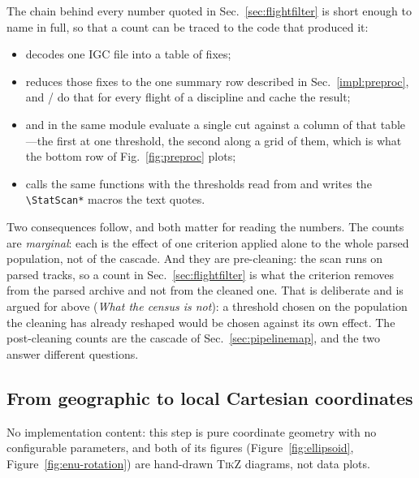 \begin{revblock}
The chain behind every number quoted in Sec.~\ref{sec:flightfilter} is short enough to
name in full, so that a count can be traced to the code that produced it:
\begin{itemize}[nosep]
  \item {} decodes one IGC file into a table of fixes;
  \item {} reduces those fixes to the one
        summary row described in Sec.~\ref{impl:preproc}, and
         /  do that for every flight of a
        discipline and cache the result;
  \item {} and  in the same module evaluate a
        single cut against a column of that table---the first at one threshold, the second
        along a grid of them, which is what the bottom row of Fig.~\ref{fig:preproc} plots;
  \item {} calls the same functions with
        the thresholds read from  and writes the
        \texttt{\textbackslash StatScan*} macros the text quotes.
\end{itemize}
Two consequences follow, and both matter for reading the numbers. The counts are
\emph{marginal}: each is the effect of one criterion applied alone to the whole parsed
population, not of the cascade. And they are pre-cleaning: the scan runs on parsed tracks,
so a count in Sec.~\ref{sec:flightfilter} is what the criterion removes from the parsed
archive and not from the cleaned one. That is deliberate and is argued for above
(\emph{What the census is not}): a threshold chosen on the population the cleaning has
already reshaped would be chosen against its own effect. The post-cleaning counts are the
cascade of Sec.~\ref{sec:pipelinemap}, and the two answer different questions.
\end{revblock}

\subsection{From geographic to local Cartesian coordinates}
\label{impl:enu}
No implementation content: this step is pure coordinate geometry with no configurable
parameters, and both of its figures (Figure~\ref{fig:ellipsoid}, Figure~\ref{fig:enu-rotation})
are hand-drawn \textsc{TikZ} diagrams, not data plots. 

